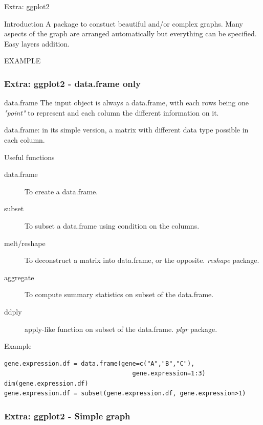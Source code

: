 \documentclass[10pt]{beamer}
\newenvironment{xframe}[2][]
  {\begin{frame}[fragile,environment=xframe,#1]
  \frametitle{#2}}
  {\end{frame}}
\begin{document}
\begin{frame}{Extra: {\sf ggplot2}}
  \begin{block}{Introduction}
    A package to constuct beautiful and/or complex graphs. Many aspects of the graph are arranged automatically but everything can be specified. Easy layers addition.
  \end{block}
  
  EXAMPLE

\end{frame}

\begin{xframe}[shrink=10]{Extra: {\sf ggplot2} - {\sf data.frame} only}
    \begin{block}{{\sf data.frame}}
    The input object is always a {\sf data.frame}, with each rows being one {\it "point"} to represent and each column the different information on it.
    \medskip
    
    {\small {\sf data.frame}: in its simple version, a {\sf matrix} with different data type possible in each column.}
  \end{block}

  \begin{block}{Useful functions}
    \begin{description}
    \item[data.frame] To create a {\sf data.frame}.
    \item[subset] To subset a {\sf data.frame} using condition on the columns.
    \item[melt/reshape] To deconstruct a matrix into data.frame, or the opposite. {\it reshape} package.
    \item[aggregate] To compute summary statistics on subset of the data.frame.
    \item[ddply] {\sf apply}-like function on subset of the data.frame. {\it plyr} package.
    \end{description}
  \end{block}
  \begin{exampleblock}{Example}
\begin{verbatim}
gene.expression.df = data.frame(gene=c("A","B","C"),
                                   gene.expression=1:3)
dim(gene.expression.df)
gene.expression.df = subset(gene.expression.df, gene.expression>1)
\end{verbatim}  
  \end{exampleblock}
\end{xframe}

\begin{xframe}{Extra: {\sf ggplot2} - Simple graph}
  \begin{block}{}
    
  \end{block}
\end{xframe}
\end{document}
